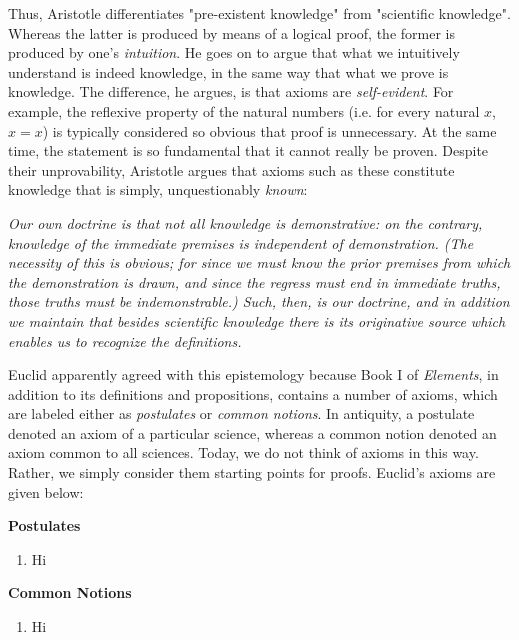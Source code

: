 Thus, Aristotle differentiates "pre-existent knowledge" from "scientific knowledge". Whereas the latter is produced by means of a logical proof, the former is produced by one's \textit{intuition}. He goes on to argue that what we intuitively understand is indeed knowledge, in the same way that what we prove is knowledge. The difference, he argues, is that axioms are \textit{self-evident}. For example, the reflexive property of the natural numbers (i.e. for every natural $x$, $x=x$) is typically considered so obvious that proof is unnecessary. At the same time, the statement is so fundamental that it cannot really be proven. Despite their unprovability, Aristotle argues that axioms such as these constitute knowledge that is simply, unquestionably \textit{known}: \\

\begin{displayquote}
	\textit{Our own doctrine is that not all knowledge is demonstrative: on the contrary, knowledge of the immediate premises is independent of demonstration. (The necessity of this is obvious; for since we must know the prior premises from which the demonstration is drawn, and since the regress must end in immediate truths, those truths must be indemonstrable.) Such, then, is our doctrine, and in addition we maintain that besides scientific knowledge there is its originative source which enables us to recognize the definitions.}
	\vspace{4mm}
\end{displayquote}

Euclid apparently agreed with this epistemology because Book I of \textit{Elements}, in addition to its definitions and propositions, contains a number of axioms, which are labeled either as \textit{postulates} or \textit{common notions}. In antiquity, a postulate denoted an axiom of a particular science, whereas a common notion denoted an axiom common to all sciences. Today, we do not think of axioms in this way. Rather, we simply consider them starting points for proofs. Euclid's axioms are given below: \\

\begin{center}
	\textbf{Postulates}
	\begin{enumerate}
		\item Hi
	\end{enumerate}
	\textbf{Common Notions}
	\begin{enumerate}
		\item Hi
	\end{enumerate}
	
\end{center}

